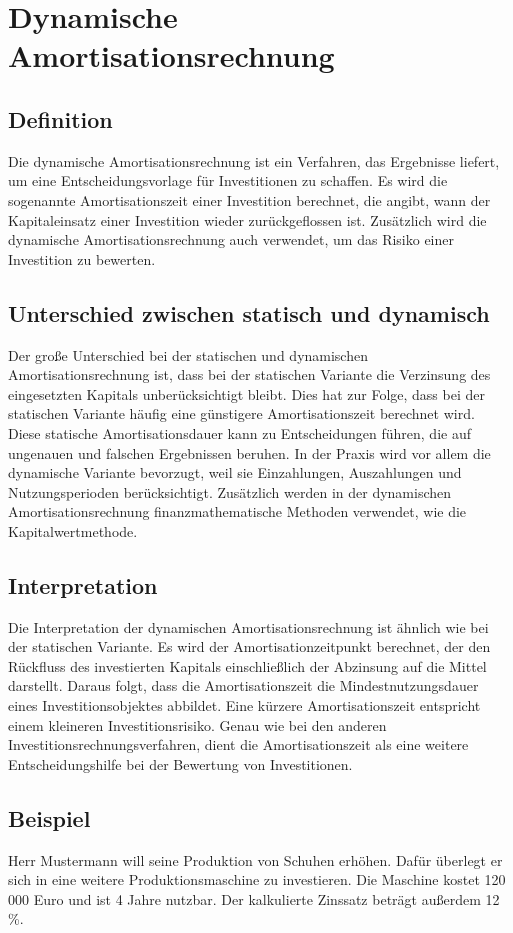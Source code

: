\chapter{Dynamische Amortisationsrechnung}
\label{Dynamische Amortisationsrechnung}

\section{Definition}
Die dynamische Amortisationsrechnung ist ein Verfahren, das Ergebnisse liefert, um eine Entscheidungsvorlage für Investitionen zu schaffen. Es wird die sogenannte Amortisationszeit einer Investition berechnet, die angibt, wann der Kapitaleinsatz einer Investition wieder zurückgeflossen ist. Zusätzlich wird die dynamische Amortisationsrechnung auch verwendet, um das Risiko einer Investition zu bewerten.

\section{Unterschied zwischen statisch und dynamisch}
Der große Unterschied bei der statischen und dynamischen Amortisationsrechnung ist, dass bei der statischen Variante die Verzinsung des eingesetzten Kapitals unberücksichtigt bleibt. Dies hat zur Folge, dass bei der statischen Variante häufig eine günstigere Amortisationszeit berechnet wird. Diese statische Amortisationsdauer kann zu Entscheidungen führen, die auf ungenauen und falschen Ergebnissen beruhen. In der Praxis wird vor allem die dynamische Variante bevorzugt, weil sie Einzahlungen, Auszahlungen und Nutzungsperioden berücksichtigt. Zusätzlich werden in der dynamischen Amortisationsrechnung finanzmathematische Methoden verwendet, wie die Kapitalwertmethode.
\newpage
\section{Interpretation}
Die Interpretation der dynamischen Amortisationsrechnung ist ähnlich wie bei der statischen Variante. Es wird der Amortisationzeitpunkt
berechnet, der den Rückfluss des investierten Kapitals einschließlich der Abzinsung auf die Mittel darstellt. Daraus folgt, dass die Amortisationszeit die Mindestnutzungsdauer eines Investitionsobjektes abbildet. Eine kürzere Amortisationszeit entspricht einem kleineren Investitionsrisiko. Genau wie bei den anderen Investitionsrechnungsverfahren, dient die Amortisationszeit als eine weitere Entscheidungshilfe bei der Bewertung von Investitionen.
\section{Beispiel}
Herr Mustermann will seine Produktion von Schuhen erhöhen. Dafür überlegt er sich in eine weitere Produktionsmaschine zu investieren. Die Maschine kostet 120 000 Euro und ist 4 Jahre nutzbar. Der kalkulierte Zinssatz beträgt außerdem 12 \%.

